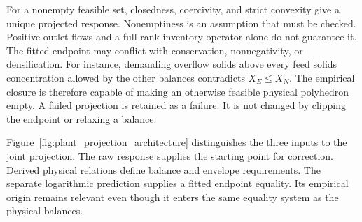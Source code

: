 For a nonempty feasible set, closedness, coercivity, and strict convexity give a unique projected response. Nonemptiness is an assumption that must be checked. Positive outlet flows and a full-rank inventory operator alone do not guarantee it. The fitted endpoint may conflict with conservation, nonnegativity, or densification. For instance, demanding overflow solids above every feed solids concentration allowed by the other balances contradicts $X_E\le X_N$. The empirical closure is therefore capable of making an otherwise feasible physical polyhedron empty. A failed projection is retained as a failure. It is not changed by clipping the endpoint or relaxing a balance.

Figure~\ref{fig:plant_projection_architecture} distinguishes the three inputs to the joint projection. The raw response supplies the starting point for correction. Derived physical relations define balance and envelope requirements. The separate logarithmic prediction supplies a fitted endpoint equality. Its empirical origin remains relevant even though it enters the same equality system as the physical balances.

